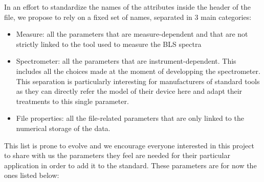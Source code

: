 \documentclass[11pt]{article}
\begin{document}
In an effort to standardize the names of the attributes inside the header of the file, we propose to rely on a fixed set of names, separated in 3 main categories:
\begin{itemize}
  \item Measure: all the parameters that are measure-dependent and that are not strictly linked to the tool used to measure the BLS spectra
  \item Spectrometer: all the parameters that are instrument-dependent. This includes all the choices made at the moment of developping the spectrometer. This separation is particularly interesting for manufacturers of standard tools as they can directly refer the model of their device here and adapt their treatments to this single parameter. 
  \item File properties: all the file-related parameters that are only linked to the numerical storage of the data.
\end{itemize}

This list is prone to evolve and we encourage everyone interested in this project to share with us the parameters they feel are needed for their particular application in order to add it to the standard. These parameters are for now the ones listed below:
\end{document}
